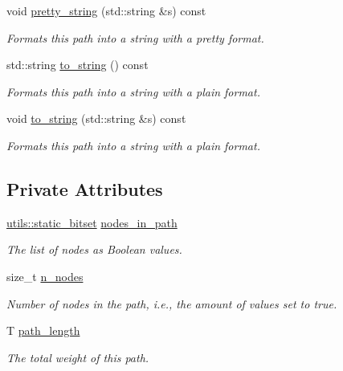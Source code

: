 \begin{DoxyCompactItemize}
void \hyperlink{classlgraph_1_1boolean__path_afc470414b972269818fa55ff4bad12ee}{pretty\+\_\+string} (std\+::string \&s) const
\begin{DoxyCompactList}\small\item\em Formats this path into a string with a \textquotesingle{}pretty\textquotesingle{} format. \end{DoxyCompactList}\item 
std\+::string \hyperlink{classlgraph_1_1boolean__path_a28c70d226f016ff660aa12f9ba7ae00e}{to\+\_\+string} () const
\begin{DoxyCompactList}\small\item\em Formats this path into a string with a plain format. \end{DoxyCompactList}\item 
void \hyperlink{classlgraph_1_1boolean__path_a372b30f0cf0f54f5053cf04e06110ec4}{to\+\_\+string} (std\+::string \&s) const
\begin{DoxyCompactList}\small\item\em Formats this path into a string with a plain format. \end{DoxyCompactList}\end{DoxyCompactItemize}
\subsection*{Private Attributes}
\begin{DoxyCompactItemize}
\item 
\hyperlink{classlgraph_1_1utils_1_1static__bitset}{utils\+::static\+\_\+bitset} \hyperlink{classlgraph_1_1boolean__path_a0ea5d4c5f7e445270bb5c0346ec7c150}{nodes\+\_\+in\+\_\+path}
\begin{DoxyCompactList}\small\item\em The list of nodes as Boolean values. \end{DoxyCompactList}\item 
\mbox{\label{classlgraph_1_1boolean__path_a98f07b983e0812fd283f16c3871793ef}} 
size\+\_\+t \hyperlink{classlgraph_1_1boolean__path_a98f07b983e0812fd283f16c3871793ef}{n\+\_\+nodes}
\begin{DoxyCompactList}\small\item\em Number of nodes in the path, i.\+e., the amount of values set to true. \end{DoxyCompactList}\item 
T \hyperlink{classlgraph_1_1boolean__path_ab298ac156fd7d73e21769fd30b2c5ad1}{path\+\_\+length}
\begin{DoxyCompactList}\small\item\em The total weight of this path. \end{DoxyCompactList}\end{DoxyCompactItemize}
